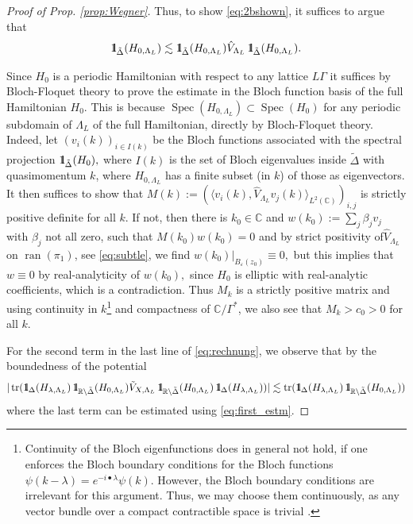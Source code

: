 \documentclass[reqno,12pt,letterpaper]{amsart}
\newcommand{\RR}{{\mathbb R}}
\newcommand{\CC}{{\mathbb C}}
\numberwithin{equation}{section}
\DeclareMathOperator{\Spec}{Spec}
\DeclareMathOperator{\tr}{tr}
\def\indic{\operatorname{1\hskip-2.75pt\relax l}}
\begin{document}
\begin{proof}[Proof of Prop. \ref{prop:Wegner}]
Thus, to show \eqref{eq:2bshown}, it suffices to argue that 
$$\indic_{\tilde \Delta}(H_{0,\Lambda_L}) \lesssim \indic_{\tilde \Delta}(H_{0,\Lambda_L}) \hat V_{\Lambda_L}  \indic_{\tilde \Delta}(H_{0,\Lambda_L}).$$

Since $H_{0}$ is a periodic Hamiltonian with respect to any lattice $L\Gamma$ it suffices by Bloch-Floquet theory to prove the estimate in the Bloch function basis of the full Hamiltonian $H_{0}.$ { This is because $\Spec(H_{0,\Lambda_L})\subset \Spec(H_0)$ for any periodic subdomain of $\Lambda_L$ of the full Hamiltonian, directly by Bloch-Floquet theory.}
Indeed, let $(v_i(k))_{i \in I(k)}$ be the Bloch functions associated with the spectral projection $\indic_{\tilde \Delta}(H_{0}),$ where $I(k)$ is the set of Bloch eigenvalues inside $\tilde \Delta$ with quasimomentum $k$, where $H_{0,\Lambda_L}$ has a finite subset (in $k$) of those as eigenvectors. 
It then suffices to show that $M(k) :=( \langle v_i(k),  \hat V_{\Lambda_L}  v_j(k) \rangle_{L^2(\CC)} )_{i,j} $ is strictly positive definite for all $k$. If not, then there is $k_0 \in \CC$ and $w(k_0):=\sum_{j} \beta_j v_j$ with $\beta_j$ not all zero, such that $M(k_0) w(k_0)=0$ and by strict positivity of$\hat V_{\Lambda_L} $ on $\operatorname{ran}(\pi_1)$, see \eqref{eq:subtle}, we find $w(k_0)\vert_{B_{\varepsilon}(z_0)} \equiv 0,$ but this implies that $w\equiv 0$ by real-analyticity of $w(k_0),$ since $H_0$ is elliptic with real-analytic coefficients, which is a contradiction. Thus $M_k$ is a strictly positive matrix and using continuity in $k$\footnote{Continuity of the Bloch eigenfunctions does in general not hold, if one enforces the Bloch boundary conditions for the Bloch functions $\psi(k-\lambda) =e^{-i \bullet \lambda}  \psi(k)$. However, the Bloch boundary conditions are irrelevant for this argument. Thus, we may choose them continuously, as any vector bundle over a compact contractible space is trivial \cite[Corr. 2.17+2.18]{notes}.} and compactness of $\CC/\Gamma^*$, we also see that $M_k >c_0 >0$ for all $k$.


For the second term in the last line of \eqref{eq:rechnung}, we observe that by the boundedness of the potential
\[\vert \tr(\indic_{\Delta}(H_{\lambda,\Lambda_L})\indic_{\RR\setminus\tilde \Delta}(H_{0,\Lambda_L}) \tilde V_{X,\Lambda_L} \indic_{\RR\setminus\tilde \Delta}(H_{0,\Lambda_L}) \indic_{\Delta}(H_{\lambda,\Lambda_L}))\vert \lesssim \tr(\indic_{\Delta}(H_{\lambda,\Lambda_L})\indic_{\RR\setminus\tilde \Delta}(H_{0,\Lambda_L}))\]
where the last term can be estimated using \eqref{eq:first_estm}. 


\end{proof}
\end{document}
